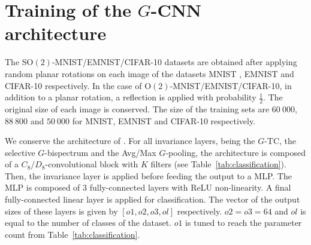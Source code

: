 \documentclass{article}
\theoremstyle{plain}
\theoremstyle{definition}
\theoremstyle{remark}
\begin{document}
\section{Training of the $G$-CNN architecture}\label{app:training}
The $\mathrm{SO}(2)$-MNIST/EMNIST/CIFAR-10 datasets are obtained after applying random planar rotations on each image of the datasets MNIST \cite{deng2012mnist}, EMNIST \cite{cohen2017emnist} and CIFAR-10 \cite{CIFAR10} respectively. In the case of $\mathrm{O}(2)$-MNIST/EMNIST/CIFAR-10, in addition to a planar rotation, a reflection is applied with probability $\frac{1}{2}$.  The original size of each image is conserved. The size of the training sets are $60\ 000$,$88\ 800$ and $50\ 000$ for MNIST, EMNIST and CIFAR-10 respectively. %

We conserve the architecture of \cite{sanborn2023general}. For all invariance layers, being the $G$-TC, the selective $G$-bispectrum and the Avg/Max $G$-pooling, the architecture is composed of a $C_8/D_8$-convolutional block with $K$ filters (see Table~\ref{tab:classification}). Then, the invariance layer is applied before feeding the output to a MLP. The MLP is composed of $3$ fully-connected layers with ReLU non-linearity. A final fully-connected linear layer is applied for classification. The vector of the output sizes of these layers is given by $[o1,o2,o3,ol]$ respectively. $o2=o3 = 64$ and $ol$ is equal to the number of classes of the dataset. $o1$ is tuned to reach the parameter count from Table~\ref{tab:classification}.
\end{document}
